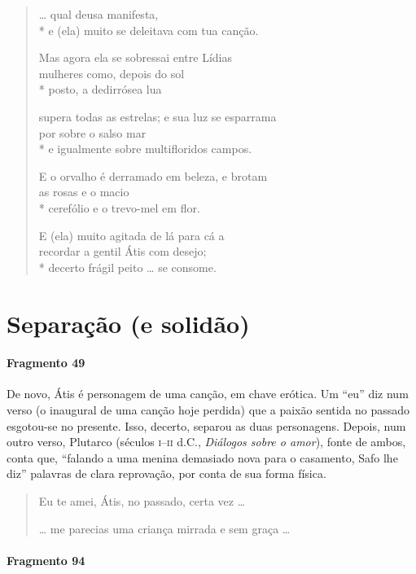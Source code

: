 \begin{verse}
\ldots{} qual deusa manifesta,\\*
e (ela) muito se deleitava com tua canção.

Mas agora ela se sobressai entre Lídias\\
mulheres como, depois do sol\\*
posto, a dedirrósea lua

supera todas as estrelas; e sua luz se esparrama\\
por sobre o salso mar \\*
e igualmente sobre multifloridos campos.

E o orvalho é derramado em beleza, e brotam\\
as rosas e o macio \\*
cerefólio e o trevo-mel em flor.

E (ela) muito agitada de lá para cá a \\
recordar a gentil Átis com desejo;\\*
decerto frágil peito \ldots{} se consome.
\end{verse}


\section{Separação (e solidão)}

\paragraph{Fragmento 49}

{\small De novo, Átis é personagem de uma canção, em chave erótica. Um “eu” diz num
verso (o inaugural de uma canção hoje perdida) que a paixão sentida no passado
esgotou-se no presente. Isso, decerto, separou as duas personagens. Depois, num
outro verso, Plutarco (séculos \textsc{i}--\textsc{ii} d.C., \textit{Diálogos sobre o amor}),
fonte de ambos, conta que, “falando a uma menina demasiado nova para o
casamento, Safo lhe diz” palavras de clara reprovação, por conta de sua forma
física. }

\begin{verse}
Eu te amei, Átis, no passado, certa vez \ldots{}

\ldots{} me parecias uma criança mirrada e sem graça \ldots{}
\end{verse}


\paragraph{Fragmento 94}

